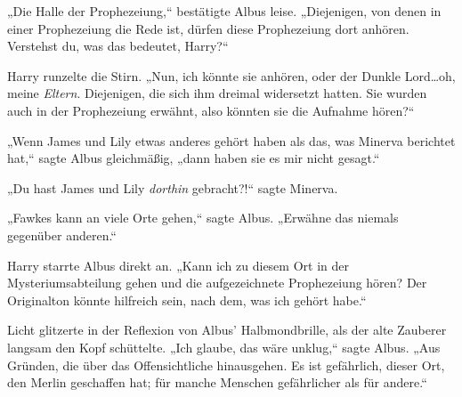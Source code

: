 „Die Halle der Prophezeiung,“ bestätigte Albus leise. „Diejenigen, von denen in einer Prophezeiung die Rede ist, dürfen diese Prophezeiung dort anhören. Verstehst du, was das bedeutet, Harry?“

Harry runzelte die Stirn. „Nun, ich könnte sie anhören, oder der Dunkle Lord…oh, meine \emph{Eltern}. Diejenigen, die sich ihm dreimal widersetzt hatten. Sie wurden auch in der Prophezeiung erwähnt, also könnten sie die Aufnahme hören?“

„Wenn James und Lily etwas anderes gehört haben als das, was Minerva berichtet hat,“ sagte Albus gleichmäßig, „dann haben sie es mir nicht gesagt.“

„Du hast James und Lily \emph{dorthin} gebracht?!“ sagte Minerva.

„Fawkes kann an viele Orte gehen,“ sagte Albus. „Erwähne das niemals gegenüber anderen.“

Harry starrte Albus direkt an. „Kann ich zu diesem Ort in der Mysteriumsabteilung gehen und die aufgezeichnete Prophezeiung hören? Der Originalton könnte hilfreich sein, nach dem, was ich gehört habe.“

Licht glitzerte in der Reflexion von Albus' Halbmondbrille, als der alte Zauberer langsam den Kopf schüttelte. „Ich glaube, das wäre unklug,“ sagte Albus. „Aus Gründen, die über das Offensichtliche hinausgehen. Es ist gefährlich, dieser Ort, den Merlin geschaffen hat; für manche Menschen gefährlicher als für andere.“

